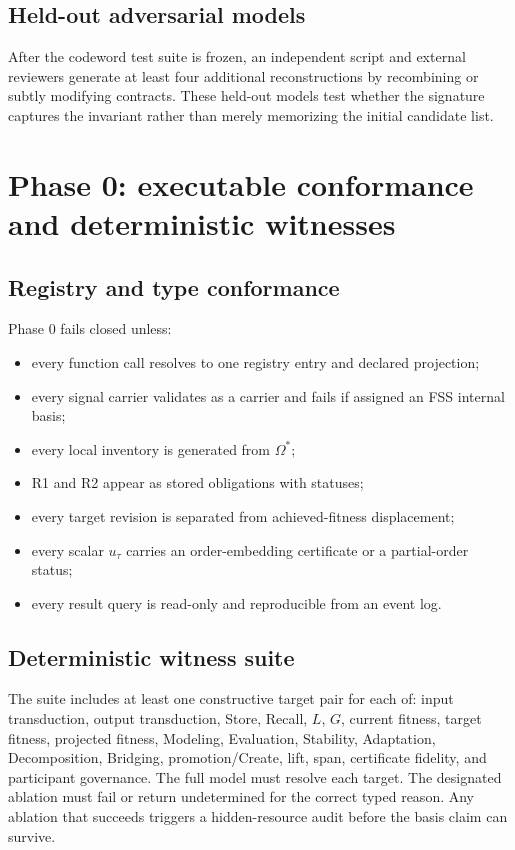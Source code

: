 \documentclass[11pt]{article}
\newcommand{\InvReg}{\Omega^{\ast}}
\begin{document}
\subsection{Held-out adversarial models}

After the codeword test suite is frozen, an independent script and external reviewers generate at least four additional reconstructions by recombining or subtly modifying contracts. These held-out models test whether the signature captures the invariant rather than merely memorizing the initial candidate list.

\section{Phase 0: executable conformance and deterministic witnesses}

\subsection{Registry and type conformance}

Phase 0 fails closed unless:
\begin{itemize}
\item every function call resolves to one registry entry and declared projection;
\item every signal carrier validates as a carrier and fails if assigned an FSS internal basis;
\item every local inventory is generated from $\InvReg$;
\item R1 and R2 appear as stored obligations with statuses;
\item every target revision is separated from achieved-fitness displacement;
\item every scalar $u_\tau$ carries an order-embedding certificate or a partial-order status;
\item every result query is read-only and reproducible from an event log.
\end{itemize}

\subsection{Deterministic witness suite}

The suite includes at least one constructive target pair for each of: input transduction, output transduction, Store, Recall, $L$, $G$, current fitness, target fitness, projected fitness, Modeling, Evaluation, Stability, Adaptation, Decomposition, Bridging, promotion/Create, lift, span, certificate fidelity, and participant governance. The full model must resolve each target. The designated ablation must fail or return undetermined for the correct typed reason. Any ablation that succeeds triggers a hidden-resource audit before the basis claim can survive.
\end{document}
